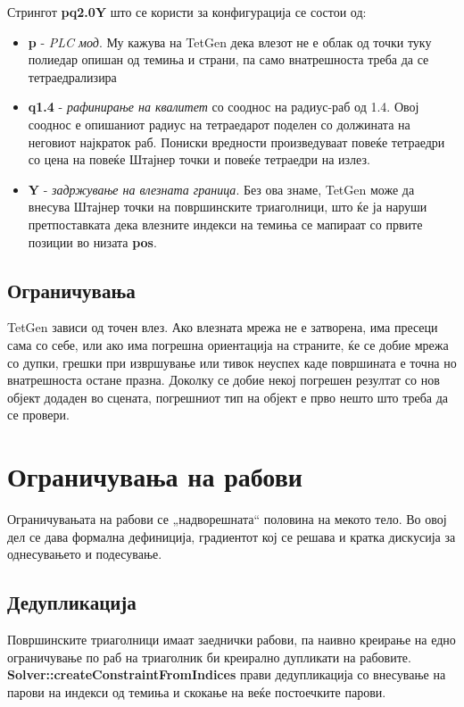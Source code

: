 Стрингот \textbf{pq2.0Y} што се користи за конфигурација се состои од:
\begin{itemize}
	\item \textbf{p} - \textit{PLC мод}. Му кажува на TetGen дека влезот не е облак од точки туку полиедар опишан од темиња и страни, па само внатрешноста треба да се тетраедрализира
	\item \textbf{q1.4} - \textit{рафинирање на квалитет} со сооднос на радиус-раб од 1.4. Овој сооднос е опишаниот радиус на тетраедарот поделен со должината на неговиот најкраток раб. Пониски вредности произведуваат повеќе тетраедри со цена на повеќе Штајнер точки и повеќе тетраедри на излез. 
	\item \textbf{Y} - \textit{задржување на влезната граница}. Без ова знаме, TetGen може да внесува Штајнер точки на површинските триаголници, што ќе ја наруши претпоставката дека влезните индекси на темиња се мапираат со првите позиции во низата \textbf{pos}.
\end{itemize}

\subsection{Ограничувања}
TetGen зависи од точен влез. Ако влезната мрежа не е затворена, има пресеци сама со себе, или ако има погрешна ориентација на страните, ќе се добие мрежа со дупки, грешки при извршување или тивок неуспех каде површината е точна но внатрешноста остане празна. Доколку се добие некој погрешен резултат со нов објект додаден во сцената, погрешниот тип на објект е прво нешто што треба да се провери.

\section{Ограничувања на рабови}
Ограничувањата на рабови се „надворешната“ половина на мекото тело. Во овој дел се дава формална дефиниција, градиентот кој се решава и кратка дискусија за однесувањето и подесување.

\subsection{Дедупликација}
Површинските триаголници имаат заеднички рабови, па наивно креирање на едно ограничување по раб на триаголник би креирално дупликати на рабовите. \textbf{Solver::createConstraintFromIndices} прави дедупликација со внесување на парови на индекси од темиња и скокање на веќе постоечките парови.
 
